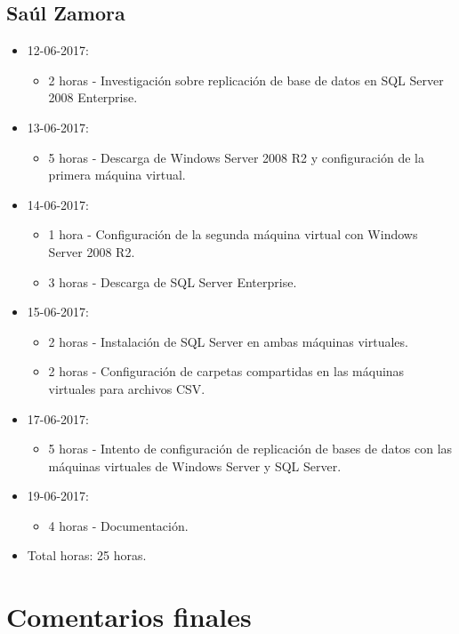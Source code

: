 \documentclass{article}
\begin{document}
\subsection{Sa\'ul Zamora}
\begin{itemize}
  \item 12-06-2017:
  \begin{itemize}
    \item 2 horas - Investigaci\'on sobre replicaci\'on de base de datos en SQL Server 2008 Enterprise.
  \end{itemize}
  \item 13-06-2017:
  \begin{itemize}
    \item 5 horas - Descarga de Windows Server 2008 R2 y configuraci\'on de la primera m\'aquina virtual.
  \end{itemize}
  \item 14-06-2017:
  \begin{itemize}
    \item 1 hora - Configuraci\'on de la segunda m\'aquina virtual con Windows Server 2008 R2.
    \item 3 horas - Descarga de SQL Server Enterprise.
  \end{itemize}
  \item 15-06-2017:
  \begin{itemize}
    \item 2 horas - Instalaci\'on de SQL Server en ambas m\'aquinas virtuales.
    \item 2 horas - Configuraci\'on de carpetas compartidas en las m\'aquinas virtuales para archivos CSV.
  \end{itemize}
  \item 17-06-2017:
  \begin{itemize}
    \item 5 horas - Intento de configuraci\'on de replicaci\'on de bases de datos con las m\'aquinas virtuales de Windows Server y SQL Server.
  \end{itemize}
  \item 19-06-2017:
  \begin{itemize}
    \item 4 horas - Documentaci\'on.
  \end{itemize}
  \item Total horas: 25 horas.
\end{itemize}

\section{Comentarios finales}
\end{document}
